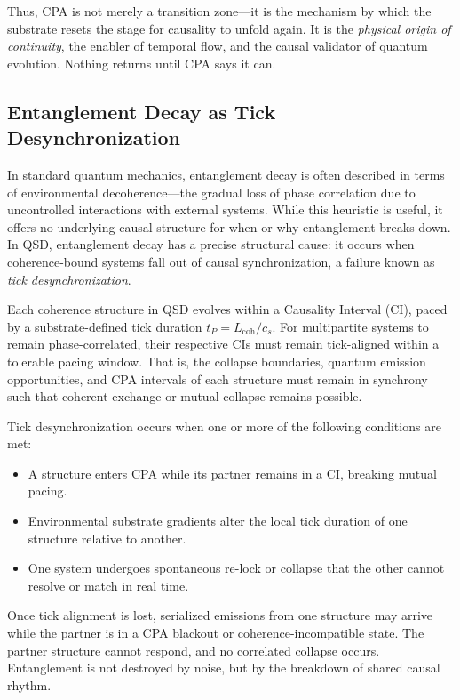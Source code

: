 \documentclass[preprints,article,submit,pdftex,moreauthors]{Definitions/mdpi}
\begin{document}
Thus, CPA is not merely a transition zone—it is the mechanism by which the substrate resets the stage for causality to unfold again. It is the \emph{physical origin of continuity}, the enabler of temporal flow, and the causal validator of quantum evolution. Nothing returns until CPA says it can.


\subsection{Entanglement Decay as Tick Desynchronization}

In standard quantum mechanics, entanglement decay is often described in terms of environmental decoherence—the gradual loss of phase correlation due to uncontrolled interactions with external systems. While this heuristic is useful, it offers no underlying causal structure for when or why entanglement breaks down. In QSD, entanglement decay has a precise structural cause: it occurs when coherence-bound systems fall out of causal synchronization, a failure known as \emph{tick desynchronization}.

Each coherence structure in QSD evolves within a Causality Interval (CI), paced by a substrate-defined tick duration \(t_P = L_{\text{coh}}/c_s\). For multipartite systems to remain phase-correlated, their respective CIs must remain tick-aligned within a tolerable pacing window. That is, the collapse boundaries, quantum emission opportunities, and CPA intervals of each structure must remain in synchrony such that coherent exchange or mutual collapse remains possible.

Tick desynchronization occurs when one or more of the following conditions are met:
\begin{itemize}
    \item A structure enters CPA while its partner remains in a CI, breaking mutual pacing.
    \item Environmental substrate gradients alter the local tick duration of one structure relative to another.
    \item One system undergoes spontaneous re-lock or collapse that the other cannot resolve or match in real time.
\end{itemize}

Once tick alignment is lost, serialized emissions from one structure may arrive while the partner is in a CPA blackout or coherence-incompatible state. The partner structure cannot respond, and no correlated collapse occurs. Entanglement is not destroyed by noise, but by the breakdown of shared causal rhythm.
\end{document}
